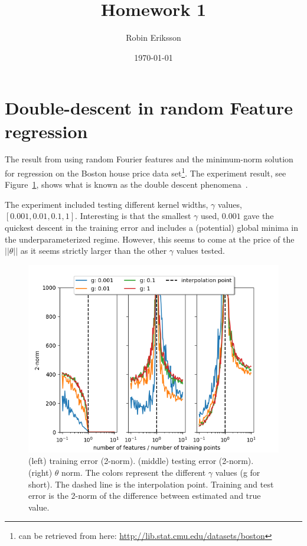 \documentclass{amsart}
\numberwithin{equation}{section}
\numberwithin{table}{section}
\numberwithin{figure}{section}
\theoremstyle{plain}
\theoremstyle{definition}
\theoremstyle{remark}
\begin{document}
\title[]{Homework 1}

\author[R. Eriksson]{Robin Eriksson}



\date{\today}


\section{Double-descent in random Feature regression}
The result from using random Fourier features and the minimum-norm
solution for regression on the Boston house price data
set\footnote{can be retrieved from here:
  \url{http://lib.stat.cmu.edu/datasets/boston}}. The experiment
result, see Figure~\ref{fig:double}, shows what is known as the double
descent phenomena~\cite{belkin2019reconciling}.

The experiment included testing different kernel widths, $\gamma$
values, $[0.001, 0.01, 0.1, 1]$. Interesting is that the smallest
$\gamma$ used, $0.001$ gave the quickest descent in the training error
and includes a (potential) global minima in the underparameterized
regime. However, this seems to come at the price of the $||\theta||$
as it seems strictly larger than the other $\gamma$ values tested.

\begin{figure}[h]
  \centering
  \includegraphics[width=0.9\linewidth, angle=0]{../Figure_1} %
  \caption{(left) training error (2-norm). (middle) testing error
    (2-norm). (right) $\theta$ norm. The colors represent the
    different $\gamma$ values (g for short). The dashed line is the
    interpolation point. Training and test error is the 2-norm of the
    difference between estimated and true value.}
  \label{fig:double}
\end{figure}



\end{document}
